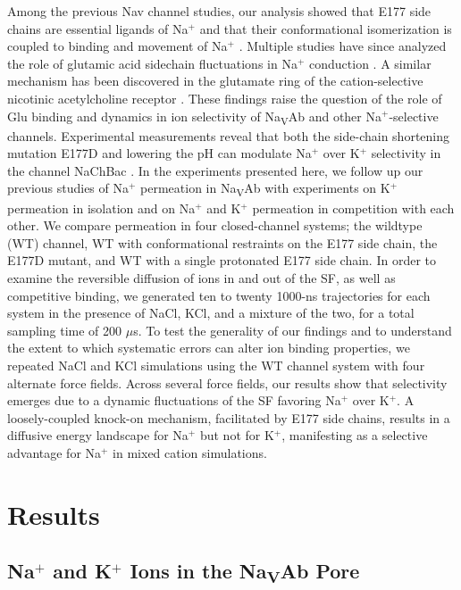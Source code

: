 \begin{refsection}
Among the previous Nav channel studies, our analysis showed that E177 side chains are essential ligands of Na$^+$ and that their conformational isomerization is coupled to binding and movement of Na$^+$ \cite{Chakrabarti:2013kd}. Multiple studies have since analyzed the role of glutamic acid sidechain fluctuations in Na$^+$ conduction \cite{Boiteux:2014ut,Domene:2015kj,Furini:2014gv,Ke:2014fy}. A similar mechanism has been discovered in the glutamate ring of the cation-selective nicotinic acetylcholine receptor \cite{Harpole:2014gu}. These findings raise the question of the role of Glu binding and dynamics in ion selectivity of Na\textsubscript{V}Ab and other Na$^+$-selective channels. Experimental measurements reveal that both the side-chain shortening mutation E177D and lowering the pH can modulate Na$^+$ over K$^+$ selectivity in the channel NaChBac \cite{FinolUrdaneta:2014bz}. In the experiments presented here, we follow up our previous studies of Na$^+$ permeation in Na\textsubscript{V}Ab \cite{Chakrabarti:2013kd} with experiments on K$^+$ permeation in isolation and on Na$^+$ and K$^+$ permeation in competition with each other. We compare permeation in four closed-channel systems; the wildtype (WT) channel, WT with conformational restraints on the E177 side chain, the E177D mutant, and WT with a single protonated E177 side chain. In order to examine the reversible diffusion of ions in and out of the SF, as well as competitive binding, we generated ten to twenty 1000-ns trajectories for each system in the presence of NaCl, KCl, and a mixture of the two, for a total sampling time of 200 $\mu$s. To test the generality of our findings and to understand the extent to which systematic errors can alter ion binding properties, we repeated NaCl and KCl simulations using the WT channel system with four alternate force fields. Across several force fields, our results show that selectivity emerges due to a dynamic fluctuations of the SF favoring Na$^+$ over K$^+$. A loosely-coupled knock-on mechanism, facilitated by E177 side chains, results in a diffusive energy landscape for Na$^+$ but not for K$^+$, manifesting as a selective advantage for Na$^+$ in mixed cation simulations. 

\section{Results}

\subsection{Na$^+$ and K$^+$ Ions in the Na\textsubscript{V}Ab Pore}


\end{refsection}
